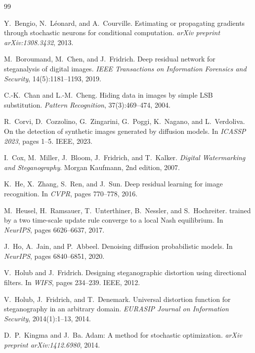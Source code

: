 \documentclass[10pt, twocolumn]{article}
\begin{document}
\begin{thebibliography}{99}

Y.~Bengio, N.~L{\'e}onard, and A.~Courville.
\newblock Estimating or propagating gradients through stochastic neurons for conditional computation.
\newblock \emph{arXiv preprint arXiv:1308.3432}, 2013.

M.~Boroumand, M.~Chen, and J.~Fridrich.
\newblock Deep residual network for steganalysis of digital images.
\newblock \emph{IEEE Transactions on Information Forensics and Security}, 14(5):1181--1193, 2019.

C.-K.~Chan and L.-M.~Cheng.
\newblock Hiding data in images by simple {LSB} substitution.
\newblock \emph{Pattern Recognition}, 37(3):469--474, 2004.

R.~Corvi, D.~Cozzolino, G.~Zingarini, G.~Poggi, K.~Nagano, and L.~Verdoliva.
\newblock On the detection of synthetic images generated by diffusion models.
\newblock In \emph{ICASSP 2023}, pages 1--5. IEEE, 2023.

I.~Cox, M.~Miller, J.~Bloom, J.~Fridrich, and T.~Kalker.
\newblock \emph{Digital Watermarking and Steganography}.
\newblock Morgan Kaufmann, 2nd edition, 2007.

K.~He, X.~Zhang, S.~Ren, and J.~Sun.
\newblock Deep residual learning for image recognition.
\newblock In \emph{CVPR}, pages 770--778, 2016.

M.~Heusel, H.~Ramsauer, T.~Unterthiner, B.~Nessler, and S.~Hochreiter.
 trained by a two time-scale update rule converge to a local {Nash} equilibrium.
\newblock In \emph{NeurIPS}, pages 6626--6637, 2017.

J.~Ho, A.~Jain, and P.~Abbeel.
\newblock Denoising diffusion probabilistic models.
\newblock In \emph{NeurIPS}, pages 6840--6851, 2020.

V.~Holub and J.~Fridrich.
\newblock Designing steganographic distortion using directional filters.
\newblock In \emph{WIFS}, pages 234--239. IEEE, 2012.

V.~Holub, J.~Fridrich, and T.~Denemark.
\newblock Universal distortion function for steganography in an arbitrary domain.
\newblock \emph{EURASIP Journal on Information Security}, 2014(1):1--13, 2014.

D.~P.~Kingma and J.~Ba.
\newblock Adam: A method for stochastic optimization.
\newblock \emph{arXiv preprint arXiv:1412.6980}, 2014.


\end{thebibliography}
\end{document}

